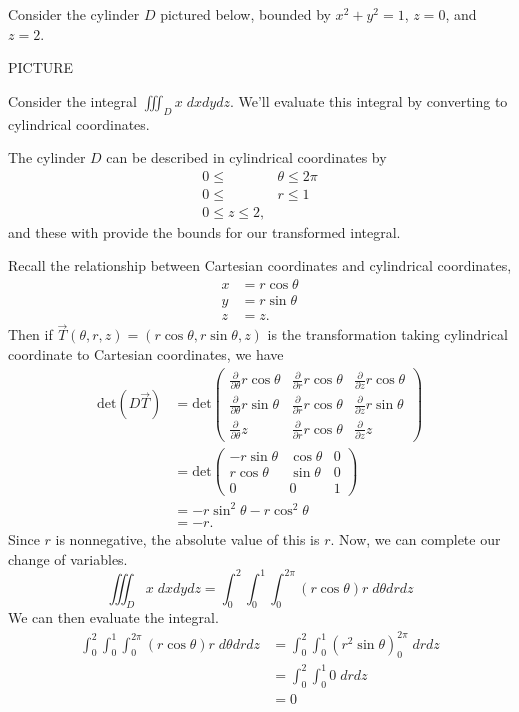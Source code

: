 \documentclass{ximera}
\begin{document}
\begin{example}
Consider the cylinder $D$ pictured below, bounded by $x^2+y^2=1$, $z=0$, and $z=2$.

PICTURE

Consider the integral $\iiint_D x\;dxdydz$. We'll evaluate this integral by converting to cylindrical coordinates.

The cylinder $D$ can be described in cylindrical coordinates by
\begin{align*}
0\leq &\theta \leq 2\pi\\
0\leq &r\leq 1\\
0\leq z\leq 2,
\end{align*}
and these with provide the bounds for our transformed integral.

Recall the relationship between Cartesian coordinates and cylindrical coordinates,
\begin{align*}
x &= r\cos \theta\\
y &= r\sin\theta\\
z &= z.
\end{align*}
Then if $\vec{T}(\theta, r, z) = (r\cos\theta, r\sin\theta, z)$ is the transformation taking cylindrical coordinate to Cartesian coordinates, we have
\begin{align*}
\text{det}(D\vec{T}) &= \text{det}\begin{pmatrix}
\frac{\partial}{\partial \theta} r\cos\theta & \frac{\partial}{\partial r} r\cos\theta & \frac{\partial}{\partial z} r\cos\theta\\
\frac{\partial}{\partial \theta} r\sin\theta & \frac{\partial}{\partial r} r\cos\theta & \frac{\partial}{\partial z} r\sin\theta\\
\frac{\partial}{\partial \theta} z & \frac{\partial}{\partial r} r\cos\theta & \frac{\partial}{\partial z} z
\end{pmatrix}\\
&= \text{det}\begin{pmatrix}
-r\sin\theta & \cos\theta & 0\\
r\cos\theta & \sin\theta & 0\\
0 & 0 & 1
\end{pmatrix}\\
&= -r\sin^2\theta -r\cos^2\theta\\
&= -r.
\end{align*}
Since $r$ is nonnegative, the absolute value of this is $r$. Now, we can complete our change of variables.
\[
\iiint_D x\;dxdydz = \int_0^2\int_0^1\int_0^{2\pi}(r\cos\theta)r\;d\theta drdz
\]
We can then evaluate the integral.
\begin{align*}
\int_0^2\int_0^1\int_0^{2\pi}(r\cos\theta)r\;d\theta drdz &= \int_0^2\int_0^1(r^2\sin\theta)_0^{2\pi}\; drdz\\
&= \int_0^2\int_0^1 0\; drdz\\
&= 0
\end{align*}
\end{example}
\end{document}
